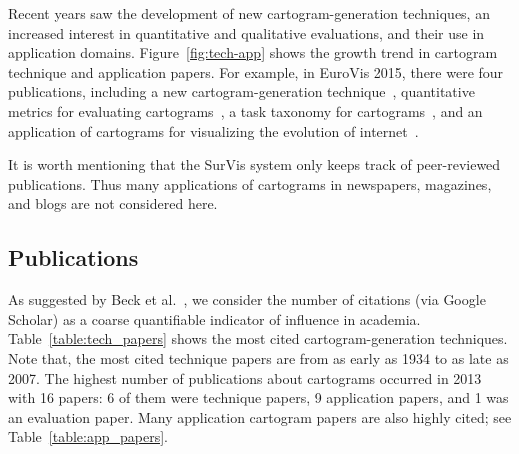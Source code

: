 \documentclass{egpubl}
\begin{document}
\begin{comment}
\begin{figure*}[htbp]
\begin{center}
\texttt{[image: technique\_screenshot]}
\caption{Technique papers on Cartograms~\cite{survis_carto}}
\label{fig:tech}
\end{center}
\end{figure*} 
\end{comment}

Recent years saw the development of new cartogram-generation techniques, 
an increased interest in quantitative and qualitative evaluations, and their use in application domains. Figure~\ref{fig:tech-app} shows the growth trend in cartogram technique and application papers. 
For example, in EuroVis 2015, there were four publications, including a new  cartogram-generation technique~\cite{cano2015mosaic}, quantitative metrics for evaluating cartograms~\cite{AKV15}, a task taxonomy for cartograms~\cite{Task_C}, and an application of cartograms for visualizing the evolution of internet~\cite{johnson2015analyzing}.

It is worth mentioning that the SurVis system only keeps track of peer-reviewed publications. Thus many applications of cartograms in newspapers, magazines, and blogs are not considered here.


\subsection{Publications}

As suggested by Beck et al.~\cite{beck2016taxonomy}, we consider the number of citations (via Google Scholar) as a coarse quantifiable indicator of influence in academia. Table~\ref{table:tech_papers} shows the most cited cartogram-generation techniques. Note that, the most cited technique papers are from as early as 1934 to as late as 2007. The highest number of publications about cartograms occurred in 2013 with 16 papers: 6 of them were technique papers, 9 application papers, and 1 was an evaluation paper. Many application cartogram papers are also highly cited; see Table~\ref{table:app_papers}.
\end{document}
